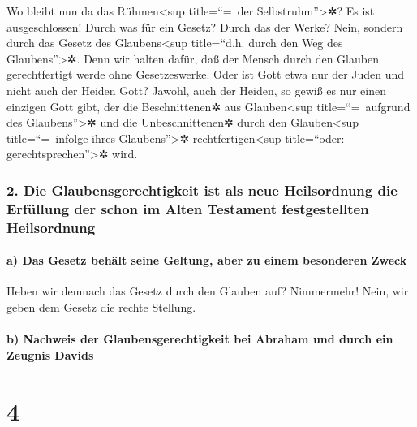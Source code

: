  Wo bleibt nun da das Rühmen\textless sup title=``=~der
Selbstruhm''\textgreater✲? Es ist ausgeschlossen! Durch was für ein
Gesetz? Durch das der Werke? Nein, sondern durch das Gesetz des
Glaubens\textless sup title=``d.h. durch den Weg des
Glaubens''\textgreater✲.  Denn wir halten dafür, daß der
Mensch durch den Glauben gerechtfertigt werde ohne Gesetzeswerke.
 Oder ist Gott etwa nur der Juden und nicht auch der
Heiden Gott? Jawohl, auch der Heiden,  so gewiß es nur
einen einzigen Gott gibt, der die Beschnittenen✲ aus
Glauben\textless sup title=``=~aufgrund des Glaubens''\textgreater✲ und
die Unbeschnittenen✲ durch den Glauben\textless sup title=``=~infolge
ihres Glaubens''\textgreater✲ rechtfertigen\textless sup title=``oder:
gerechtsprechen''\textgreater✲ wird.

\hypertarget{die-glaubensgerechtigkeit-ist-als-neue-heilsordnung-die-erfuxfcllung-der-schon-im-alten-testament-festgestellten-heilsordnung}{%
\subsubsection{2. Die Glaubensgerechtigkeit ist als neue Heilsordnung
die Erfüllung der schon im Alten Testament festgestellten
Heilsordnung}\label{die-glaubensgerechtigkeit-ist-als-neue-heilsordnung-die-erfuxfcllung-der-schon-im-alten-testament-festgestellten-heilsordnung}}

\hypertarget{a-das-gesetz-behuxe4lt-seine-geltung-aber-zu-einem-besonderen-zweck}{%
\paragraph{a) Das Gesetz behält seine Geltung, aber zu einem besonderen
Zweck}\label{a-das-gesetz-behuxe4lt-seine-geltung-aber-zu-einem-besonderen-zweck}}

 Heben wir demnach das Gesetz durch den Glauben auf?
Nimmermehr! Nein, wir geben dem Gesetz die rechte Stellung.

\hypertarget{b-nachweis-der-glaubensgerechtigkeit-bei-abraham-und-durch-ein-zeugnis-davids}{%
\paragraph{b) Nachweis der Glaubensgerechtigkeit bei Abraham und durch
ein Zeugnis
Davids}\label{b-nachweis-der-glaubensgerechtigkeit-bei-abraham-und-durch-ein-zeugnis-davids}}

\hypertarget{section-3}{%
\section{4}\label{section-3}}

